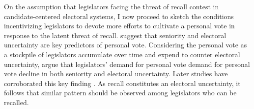 \documentclass[hyphens, crop=false]{standalone}
\begin{document}
		On the assumption that legislators facing the threat of recall contest in candidate-centered electoral systems,
		I now proceed to sketch the conditions incentivizing legislators to devote more efforts to cultivate a personal vote in response to the latent threat of recall.
		\citeauthor{cainPersonalVoteConstituency1987}
		\autocite*{cainPersonalVoteConstituency1987}
		suggest that seniority and electoral uncertainty are key predictors of personal vote.
		Considering the personal vote as a stockpile of legislators accumulate over time and expend to counter electoral uncertainty,
		\citeauthor{cainPersonalVoteConstituency1987}
		\autocite*{cainPersonalVoteConstituency1987}
		argue that legislators' demand for personal vote demand for personal vote decline in both seniority and electoral uncertainty.
		Later studies have 
		corroborated this key finding
		\autocite{hibbingCongressionalCareersContours1991,ansolabehereOldVotersNew2000}.
		As recall constitutes an electoral uncertainty, it follows that similar pattern should be observed among legislators who can be recalled.
		
\end{document}
